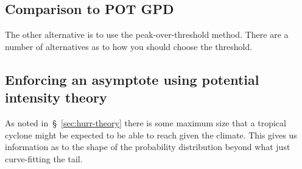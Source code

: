 \subsection{Comparison to POT GPD}
The other alternative is to use the peak-over-threshold method.
There are a number of alternatives as to how you should choose the
threshold.

\subsection{Enforcing an asymptote using potential intensity theory }
As noted in~§~\ref{sec:hurr-theory} there is some maximum size
that a tropical cyclone might be expected to be able to reach given
the climate. This gives us information as to the shape of the probability
distribution beyond what just curve-fitting the tail.
